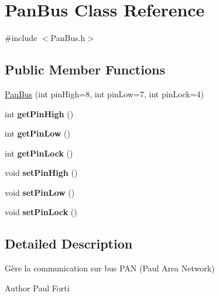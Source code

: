 \hypertarget{class_pan_bus}{\section{Pan\-Bus Class Reference}
\label{class_pan_bus}
}


{\ttfamily \#include $<$Pan\-Bus.\-h$>$}

\subsection*{Public Member Functions}
\begin{DoxyCompactItemize}
\item 
\hyperlink{class_pan_bus_a1baa272c889e04e57947d4859ea0b0b4}{Pan\-Bus} (int pin\-High=8, int pin\-Low=7, int pin\-Lock=4)
\item 
\hypertarget{class_pan_bus_a65208b9bae90fb9fef0cfecddd181621}{int {\bfseries get\-Pin\-High} ()}\label{class_pan_bus_a65208b9bae90fb9fef0cfecddd181621}

\item 
\hypertarget{class_pan_bus_aa5887849b81527eafa1af94a1f76dcc6}{int {\bfseries get\-Pin\-Low} ()}\label{class_pan_bus_aa5887849b81527eafa1af94a1f76dcc6}

\item 
\hypertarget{class_pan_bus_a0b1de511b03db98b77d0596e063101c1}{int {\bfseries get\-Pin\-Lock} ()}\label{class_pan_bus_a0b1de511b03db98b77d0596e063101c1}

\item 
\hypertarget{class_pan_bus_a7db52e7560d18160bb82b7afbc7c7dfe}{void {\bfseries set\-Pin\-High} ()}\label{class_pan_bus_a7db52e7560d18160bb82b7afbc7c7dfe}

\item 
\hypertarget{class_pan_bus_a8cbbfa073d8f83189711c49c1f140890}{void {\bfseries set\-Pin\-Low} ()}\label{class_pan_bus_a8cbbfa073d8f83189711c49c1f140890}

\item 
\hypertarget{class_pan_bus_a1c12410f38f72daee02ce74279f1c329}{void {\bfseries set\-Pin\-Lock} ()}\label{class_pan_bus_a1c12410f38f72daee02ce74279f1c329}

\end{DoxyCompactItemize}


\subsection{Detailed Description}
Gère la communication sur bus P\-A\-N (Paul Area Network) \begin{DoxyAuthor}{Author}
Paul Forti 
\end{DoxyAuthor}


